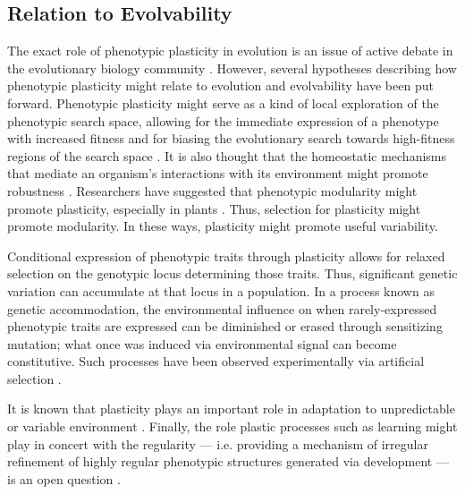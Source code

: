 \subsection{Relation to Evolvability}

The exact role of phenotypic plasticity in evolution is an issue of active debate in the evolutionary biology community \cite{Pigliucci2008IsEvolvable}. However, several hypotheses describing how phenotypic plasticity might relate to evolution and evolvability have been put forward. Phenotypic plasticity might serve as a kind of local exploration of the phenotypic search space, allowing for the immediate expression of a phenotype with increased fitness and for biasing the evolutionary search towards high-fitness regions of the search space \cite{Downing2012HeterochronousBaldwinism}. It is also thought that the homeostatic mechanisms that mediate an organism's interactions with its environment might promote robustness \cite{Moczek2011TheInnovation}.\mindmapmark{\robustnessplasticity} Researchers have suggested that phenotypic modularity might promote plasticity, especially in plants \cite{Schlichting1986ThePlants, DeKroon2005APlants}. Thus, selection for plasticity might promote modularity.\mindmapmark{\modularityplasticity} In these ways, plasticity might promote useful variability.

Conditional expression of phenotypic traits through plasticity allows for relaxed selection on the genotypic locus determining those traits. Thus, significant genetic variation can accumulate at that locus in a population.\mindmapmark{\interindividualdegeneracyrobustness} In a process known as genetic accommodation, the environmental influence on when rarely-expressed phenotypic traits are expressed can be diminished or erased through sensitizing mutation; what once was induced via environmental signal can become constitutive. Such processes have been observed experimentally via artificial selection \cite{Moczek2011TheInnovation}.

It is known that plasticity plays an important role in adaptation to unpredictable or variable environment \cite{Fusco2010PhenotypicConcepts}. Finally, the role plastic processes such as learning might play in concert with the regularity --- i.e. providing a mechanism of irregular refinement of highly regular phenotypic structures generated via development --- is an open question  \cite{Clune2011OnRegularity}.\mindmapmark{\usefulvariationregularitycomplexificationplasticity}\mindmapmark{\usefulvariationregularitycomplexification}

